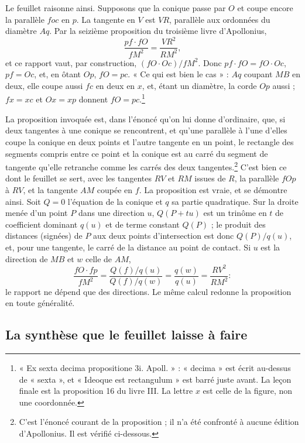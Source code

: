 \documentclass[11pt,a4paper]{article}
\begin{document}
Le feuillet raisonne ainsi. Supposons que la conique passe par $O$ et coupe
encore la parallèle $foc$ en $p$. La tangente en $V$ est $VR$, parallèle aux
ordonnées du diamètre $Aq$. Par la seizième proposition du troisième livre
d'Apollonius,
\[ \frac{pf\cdot fO}{fM^2} = \frac{VR^2}{RM^2} ,\]
et ce rapport vaut, par construction, $(fO\cdot Oc)/fM^2$. Donc
$pf\cdot fO = fO\cdot Oc$, $pf = Oc$, et, en ôtant $Op$, $fO = pc$. « Ce qui est
bien le cas » : $Aq$ coupant $MB$ en deux, elle coupe aussi $fc$ en deux en
$x$, et, étant un diamètre, la corde $Op$ aussi ; $fx = xc$ et $Ox = xp$
donnent $fO = pc$.\footnote{« Ex sexta decima propositione 3i. Apoll. » :
« decima » est écrit au-dessus de « sexta », et « Ideoque est rectangulum » est
barré juste avant. La leçon finale est la proposition 16 du livre III. La
lettre $x$ est celle de la figure, non une coordonnée.}

La proposition invoquée est, dans l'énoncé qu'on lui donne d'ordinaire, que,
si deux tangentes à une conique se rencontrent, et qu'une parallèle à l'une
d'elles coupe la conique en deux points et l'autre tangente en un point, le
rectangle des segments compris entre ce point et la conique est au carré du
segment de tangente qu'elle retranche comme les carrés des deux
tangentes.\footnote{C'est l'énoncé courant de la proposition ; il n'a été
confronté à aucune édition d'Apollonius. Il est vérifié ci-dessous.} C'est
bien ce dont le feuillet se sert, avec les tangentes $RV$ et $RM$ issues de
$R$, la parallèle $fOp$ à $RV$, et la tangente $AM$ coupée en $f$. La
proposition est vraie, et se démontre ainsi. Soit $Q = 0$ l'équation de la
conique et $q$ sa partie quadratique. Sur la droite menée d'un point $P$ dans
une direction $u$, $Q(P + tu)$ est un trinôme en $t$ de coefficient dominant
$q(u)$ et de terme constant $Q(P)$ ; le produit des distances (signées) de $P$
aux deux points d'intersection est donc $Q(P)/q(u)$, et, pour une tangente, le
carré de la distance au point de contact. Si $u$ est la direction de $MB$ et
$w$ celle de $AM$,
\[ \frac{fO\cdot fp}{fM^2} = \frac{Q(f)/q(u)}{Q(f)/q(w)} = \frac{q(w)}{q(u)}
   = \frac{RV^2}{RM^2} : \]
le rapport ne dépend que des directions. Le même calcul redonne la
proposition en toute généralité.

\subsection*{La synthèse que le feuillet laisse à faire}
\end{document}
